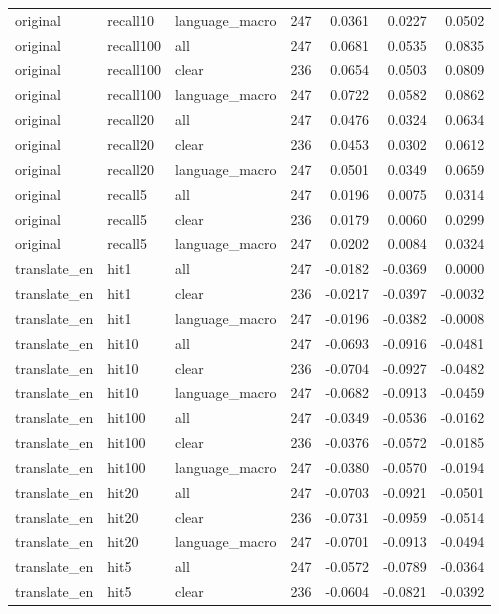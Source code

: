 \begin{tabular}{lllrrrr}
original & recall10 & language\_macro & 247 & 0.0361 & 0.0227 & 0.0502 \\
original & recall100 & all & 247 & 0.0681 & 0.0535 & 0.0835 \\
original & recall100 & clear & 236 & 0.0654 & 0.0503 & 0.0809 \\
original & recall100 & language\_macro & 247 & 0.0722 & 0.0582 & 0.0862 \\
original & recall20 & all & 247 & 0.0476 & 0.0324 & 0.0634 \\
original & recall20 & clear & 236 & 0.0453 & 0.0302 & 0.0612 \\
original & recall20 & language\_macro & 247 & 0.0501 & 0.0349 & 0.0659 \\
original & recall5 & all & 247 & 0.0196 & 0.0075 & 0.0314 \\
original & recall5 & clear & 236 & 0.0179 & 0.0060 & 0.0299 \\
original & recall5 & language\_macro & 247 & 0.0202 & 0.0084 & 0.0324 \\
translate\_en & hit1 & all & 247 & -0.0182 & -0.0369 & 0.0000 \\
translate\_en & hit1 & clear & 236 & -0.0217 & -0.0397 & -0.0032 \\
translate\_en & hit1 & language\_macro & 247 & -0.0196 & -0.0382 & -0.0008 \\
translate\_en & hit10 & all & 247 & -0.0693 & -0.0916 & -0.0481 \\
translate\_en & hit10 & clear & 236 & -0.0704 & -0.0927 & -0.0482 \\
translate\_en & hit10 & language\_macro & 247 & -0.0682 & -0.0913 & -0.0459 \\
translate\_en & hit100 & all & 247 & -0.0349 & -0.0536 & -0.0162 \\
translate\_en & hit100 & clear & 236 & -0.0376 & -0.0572 & -0.0185 \\
translate\_en & hit100 & language\_macro & 247 & -0.0380 & -0.0570 & -0.0194 \\
translate\_en & hit20 & all & 247 & -0.0703 & -0.0921 & -0.0501 \\
translate\_en & hit20 & clear & 236 & -0.0731 & -0.0959 & -0.0514 \\
translate\_en & hit20 & language\_macro & 247 & -0.0701 & -0.0913 & -0.0494 \\
translate\_en & hit5 & all & 247 & -0.0572 & -0.0789 & -0.0364 \\
translate\_en & hit5 & clear & 236 & -0.0604 & -0.0821 & -0.0392 \\

\end{tabular}
